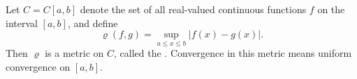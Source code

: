 Let $C = C[a,b]$ denote the set of all real-valued continuous functions $f$ on the interval $[a,b]$, and define
$$\varrho(f, g) = \sup_{a \leq x \leq b} |f(x) - g(x)|.$$
Then $\varrho$ is a metric on $C$, called the . Convergence in this metric means uniform convergence on $[a,b]$.
